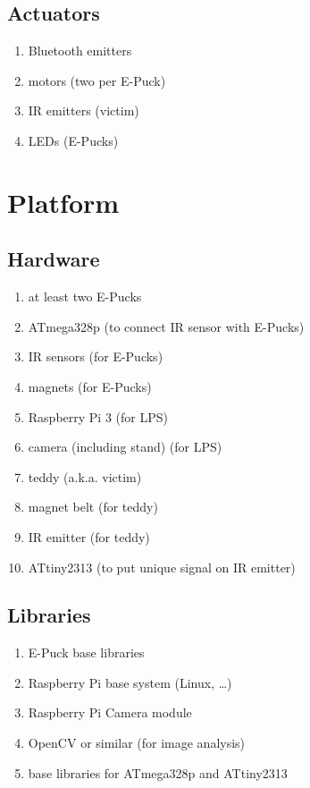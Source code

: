 \documentclass[a4paper,parskip,headheight=38pt]{scrartcl} %
\begin{document}
\subsection{Actuators}
\begin{enumerate}[label=\actuators]
\item Bluetooth emitters
\item motors (two per E-Puck)
\item IR emitters (victim)
\item LEDs (E-Pucks)
\end{enumerate}


\section{Platform}

\subsection{Hardware}
\begin{enumerate}[label=\hardware]
\item at least two E-Pucks
\item ATmega328p (to connect IR sensor with E-Pucks)
\item IR sensors (for E-Pucks)
\item magnets (for E-Pucks)
\item Raspberry Pi 3 (for LPS)
\item camera (including stand) (for LPS)
\item teddy (a.k.a. victim)
\item magnet belt (for teddy)
\item IR emitter (for teddy)
\item ATtiny2313 (to put unique signal on IR emitter)
\end{enumerate}

\subsection{Libraries}
\begin{enumerate}[label=\libs]
\item E-Puck base libraries
\item Raspberry Pi base system (Linux, \ldots)
\item Raspberry Pi Camera module
\item OpenCV or similar (for image analysis)
\item base libraries for ATmega328p and ATtiny2313
\end{enumerate}
\end{document}
